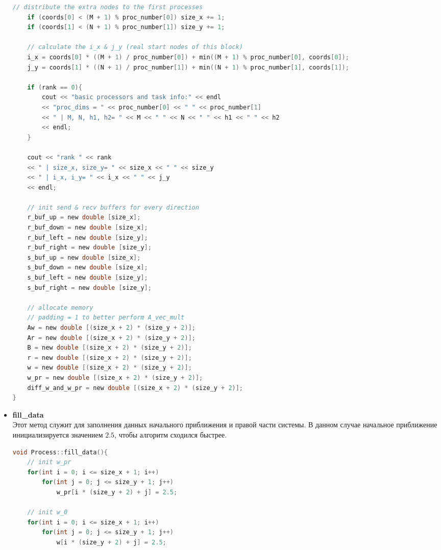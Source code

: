 \documentclass{article}
\begin{document}
\begin{itemize}
\begin{lstlisting}[language=C, caption=Process::init\_processor\_config()]
    // distribute the extra nodes to the first processes
    if (coords[0] < (M + 1) % proc_number[0]) size_x += 1;
    if (coords[1] < (N + 1) % proc_number[1]) size_y += 1;

    // calculate the i_x & j_y (real start nodes of this block)
    i_x = coords[0] * ((M + 1) / proc_number[0]) + min((M + 1) % proc_number[0], coords[0]);
    j_y = coords[1] * ((N + 1) / proc_number[1]) + min((N + 1) % proc_number[1], coords[1]);

    if (rank == 0){
        cout << "basic processors and task info:" << endl
        << "proc_dims = " << proc_number[0] << " " << proc_number[1]
        << " | M, N, h1, h2= " << M << " " << N << " " << h1 << " " << h2
        << endl;
    }
    
    cout << "rank " << rank 
    << " | size_x, size_y= " << size_x << " " << size_y 
    << " | i_x, i_y= " << i_x << " " << j_y 
    << endl;

    // init send & recv buffers for every direction
    r_buf_up = new double [size_x];
    r_buf_down = new double [size_x];
    r_buf_left = new double [size_y];
    r_buf_right = new double [size_y]; 
    s_buf_up = new double [size_x];
    s_buf_down = new double [size_x];
    s_buf_left = new double [size_y];
    s_buf_right = new double [size_y];

    // allocate memory
    // padding = 1 to better perform A_vec_mult
    Aw = new double [(size_x + 2) * (size_y + 2)];
    Ar = new double [(size_x + 2) * (size_y + 2)];
    B = new double [(size_x + 2) * (size_y + 2)];
    r = new double [(size_x + 2) * (size_y + 2)];
    w = new double [(size_x + 2) * (size_y + 2)];
    w_pr = new double [(size_x + 2) * (size_y + 2)];
    diff_w_and_w_pr = new double [(size_x + 2) * (size_y + 2)];
}
    \end{lstlisting}
    \item \textbf{fill\_data}\\
    Этот метод служит для заполнения данных начального приближения и правой части системы. В данном случае начальное приближение инициализируется значением $2.5$, чтобы алгоритм сходился быстрее. 
    \begin{lstlisting}[language=C, caption=Process::fill\_data()]
void Process::fill_data(){
    // init w_pr
    for(int i = 0; i <= size_x + 1; i++)
        for(int j = 0; j <= size_y + 1; j++)
            w_pr[i * (size_y + 2) + j] = 2.5;
    
    // init w_0
    for(int i = 0; i <= size_x + 1; i++)
        for(int j = 0; j <= size_y + 1; j++)
            w[i * (size_y + 2) + j] = 2.5;


\end{lstlisting}
\end{itemize}
\end{document}
